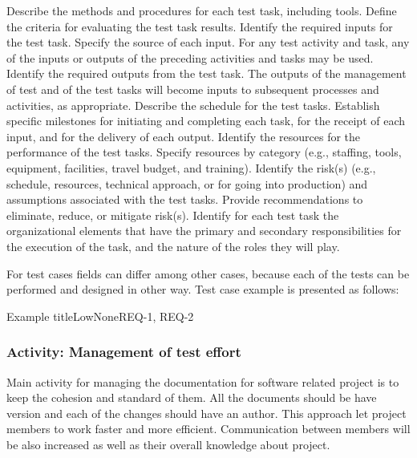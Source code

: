 		{
			{
				Describe the methods and procedures for each test task, including tools. Define
				the criteria for evaluating the test task results.
			}
			{
				Identify the required inputs for the test task. Specify the source of each input. For
				any test activity and task, any of the inputs or outputs of the preceding activities and tasks
				may be used.
			}
			{
				Identify the required outputs from the test task. The outputs of the management of
				test and of the test tasks will become inputs to subsequent processes and activities, as
				appropriate.
			}
			{
				Describe the schedule for the test tasks. Establish specific milestones for
				initiating and completing each task, for the receipt of each input, and for the delivery of
				each output.
			}
			{
				Identify the resources for the performance of the test tasks. Specify resources by
				category (e.g., staffing, tools, equipment, facilities, travel budget, and training).
			}
			{
				Identify the risk(s) (e.g., schedule, resources, technical approach, or
				for going into production) and assumptions associated with the test tasks. Provide
				recommendations to eliminate, reduce, or mitigate risk(s).
			}
			{
				Identify for each test task the organizational elements that have
				the primary and secondary responsibilities for the execution of the task, and the nature of the roles they will play.
			}
		}
		
		For test cases fields can differ among other cases, because each of the tests can be performed and designed in other way. Test case example is presented as follows:
		\begin{testcase}{Example title}{Low}{None}{REQ-1, REQ-2}
		\end{testcase}
	
	\subsubsection{Activity: Management of test effort} \label{s:details-of-the-master-test-plan:activity-management-of-test-effort}
	Main activity for managing the documentation for software related project is to keep the cohesion and standard of them. All the documents should be have version and each of the changes should have an author. This approach let project members to work faster and more efficient. Communication between members will be also increased as well as their overall knowledge about project.

